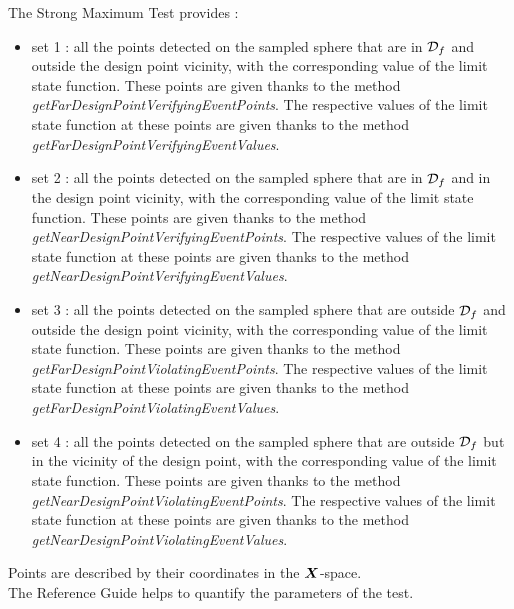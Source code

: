 The Strong Maximum Test provides :
\begin{itemize}
\item set 1 : all the points detected on the sampled sphere  that are in ${\mathcal D}_f$ and outside the design point vicinity, with the corresponding value of the limit state function. These points are given thanks to the method {\em getFarDesignPointVerifyingEventPoints}. The respective values of the limit state function at these points are given thanks to the method {\em getFarDesignPointVerifyingEventValues}.
\item set 2 : all the points detected on the sampled sphere  that are in ${\mathcal D}_f$ and in the design point vicinity, with the corresponding value of the limit state function. These points are given thanks to the method {\em getNearDesignPointVerifyingEventPoints}. The respective values of the limit state function at these points are given thanks to the method {\em getNearDesignPointVerifyingEventValues}.
\item set 3 : all the points detected on the sampled sphere  that are outside ${\mathcal D}_f$ and  outside the design point vicinity, with the corresponding value of the limit state function. These points are given thanks to the method {\em getFarDesignPointViolatingEventPoints}. The respective values of the limit state function at these points are given thanks to the method {\em getFarDesignPointViolatingEventValues}.
\item set 4 : all the points detected on the sampled sphere  that are outside ${\mathcal D}_f$ but in the vicinity of the design point, with the corresponding value of the limit state function. These points are given thanks to the method {\em getNearDesignPointViolatingEventPoints}. The respective values of the limit state function at these points are given thanks to the method {\em getNearDesignPointViolatingEventValues}.
\end{itemize}
Points are described by their coordinates  in the ${\boldsymbol{X}}$-space.\\

The Reference Guide helps to quantify the parameters of the test.\\

